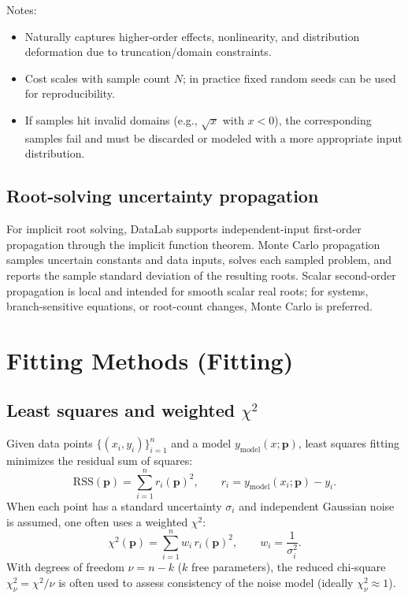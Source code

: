 \documentclass[a4paper,11pt]{article}
\begin{document}
Notes:
\begin{itemize}
  \item Naturally captures higher-order effects, nonlinearity, and distribution deformation due to truncation/domain constraints.
  \item Cost scales with sample count $N$; in practice fixed random seeds can be used for reproducibility.
  \item If samples hit invalid domains (e.g., $\sqrt{x}$ with $x<0$), the corresponding samples fail and must be discarded or modeled with a more appropriate input distribution.
\end{itemize}

\subsection{Root-solving uncertainty propagation}

For implicit root solving, DataLab supports independent-input first-order propagation through the implicit function theorem. Monte Carlo propagation samples uncertain constants and data inputs, solves each sampled problem, and reports the sample standard deviation of the resulting roots. Scalar second-order propagation is local and intended for smooth scalar real roots; for systems, branch-sensitive equations, or root-count changes, Monte Carlo is preferred.

\section{Fitting Methods (Fitting)}

\subsection{Least squares and weighted $\chi^2$}

Given data points $\{(x_i,y_i)\}_{i=1}^{n}$ and a model $y_{\mathrm{model}}(x;\bm{p})$, least squares fitting minimizes the residual sum of squares:
\begin{equation}
\mathrm{RSS}(\bm{p})=\sum_{i=1}^{n} r_i(\bm{p})^2,\qquad r_i=y_{\mathrm{model}}(x_i;\bm{p})-y_i.
\end{equation}
When each point has a standard uncertainty $\sigma_i$ and independent Gaussian noise is assumed, one often uses a weighted $\chi^2$:
\begin{equation}
\chi^2(\bm{p})=\sum_{i=1}^{n} w_i\,r_i(\bm{p})^2,\qquad w_i=\frac{1}{\sigma_i^2}.
\end{equation}
With degrees of freedom $\nu=n-k$ ($k$ free parameters), the reduced chi-square $\chi^2_\nu=\chi^2/\nu$ is often used to assess consistency of the noise model (ideally $\chi^2_\nu\approx 1$).
\end{document}
